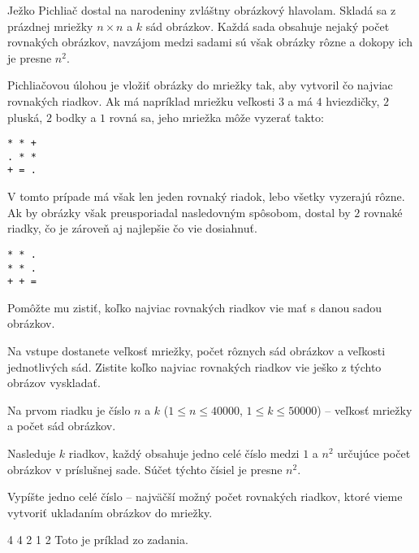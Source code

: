 




Ježko Pichliač dostal na narodeniny zvláštny obrázkový hlavolam. Skladá sa z prázdnej mriežky
$n\times n$ a $k$ sád obrázkov. Každá sada obsahuje nejaký počet rovnakých obrázkov, navzájom medzi
sadami sú však obrázky rôzne a dokopy ich je presne $n^2$.

Pichliačovou úlohou je vložiť obrázky do mriežky tak, aby vytvoril čo najviac rovnakých riadkov. Ak
má napríklad mriežku veľkosti $3$ a má $4$ hviezdičky, $2$ pluská, $2$ bodky a $1$ rovná sa, jeho
mriežka môže vyzerať takto:

\begin{verbatim}
* * +
. * *
+ = .
\end{verbatim}

V tomto prípade má však len jeden rovnaký riadok, lebo všetky vyzerajú rôzne. Ak by obrázky však
preusporiadal nasledovným spôsobom, dostal by $2$ rovnaké riadky, čo je zároveň aj najlepšie čo vie
dosiahnuť.

\begin{verbatim}
* * .
* * .
+ + =
\end{verbatim}

Pomôžte mu zistiť, koľko najviac rovnakých riadkov vie mať s danou sadou obrázkov.


Na vstupe dostanete veľkosť mriežky, počet rôznych sád obrázkov a veľkosti jednotlivých sád. Zistite
koľko najviac rovnakých riadkov vie ješko z týchto obrázov vyskladať.


Na prvom riadku je číslo $n$ a $k$ ($1\leq n \leq 40000$, $1 \leq k \leq 50000$) -- veľkosť mriežky
a počet sád obrázkov.

Nasleduje $k$ riadkov, každý obsahuje jedno celé číslo medzi $1$ a $n^2$ určujúce počet obrázkov v
príslušnej sade. Súčet týchto čísiel je presne $n^2$.


Vypíšte jedno celé číslo -- najväčší možný počet rovnakých riadkov, ktoré vieme vytvoriť ukladaním
obrázkov do mriežky.


 4
4
2
1
2
\komentar
Toto je príklad zo zadania.
\koniec



